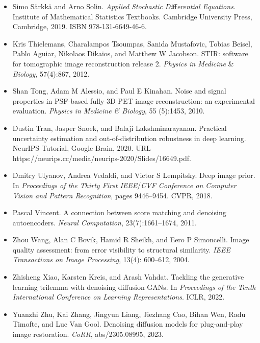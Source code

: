 \documentclass{article}
\begin{document}
\begin{itemize}
\item 
Simo Särkkä and Arno Solin. \textit{Applied Stochastic Di}ff\textit{erential Equations}. Institute of Mathematical Statistics Textbooks. Cambridge University Press, Cambridge, 2019. ISBN 978-131-6649-46-6.

\item 
Kris Thielemans, Charalampos Tsoumpas, Sanida Mustafovic, Tobias Beisel, Pablo Aguiar, Nikolaos Dikaios, and Matthew W Jacobson. STIR: software for tomographic image reconstruction release 2. \textit{Physics in Medicine} \& \textit{Biology}, 57(4):867, 2012.

\item 
Shan Tong, Adam M Alessio, and Paul E Kinahan. Noise and signal properties in PSF-based fully 3D PET image reconstruction: an experimental evaluation. \textit{Physics in Medicine \& Biology}, 55 (5):1453, 2010.

\item 
Dustin Tran, Jasper Snoek, and Balaji Lakshminarayanan. Practical uncertainty estimation and out-of-distribution robustness in deep learning. NeurIPS Tutorial, Google Brain, 2020. URL https://neurips.cc/media/neurips-2020/Slides/16649.pdf.

\item 
Dmitry Ulyanov, Andrea Vedaldi, and Victor S Lempitsky. Deep image prior. In \textit{Proceedings of the Thirty First IEEE}/\textit{CVF Conference on Computer Vision and Pattern Recognition}, pages 9446–9454. CVPR, 2018.

\item 
Pascal Vincent. A connection between score matching and denoising autoencoders. \textit{Neural Computation}, 23(7):1661–1674, 2011.

\item 
Zhou Wang, Alan C Bovik, Hamid R Sheikh, and Eero P Simoncelli. Image quality assessment: from error visibility to structural similarity. \textit{IEEE Transactions on Image Processing}, 13(4): 600–612, 2004.

\item 
Zhisheng Xiao, Karsten Kreis, and Arash Vahdat. Tackling the generative learning trilemma with denoising diffusion GANs. In \textit{Proceedings of the Tenth International Conference on Learning Representations}. ICLR, 2022.

\item 
Yuanzhi Zhu, Kai Zhang, Jingyun Liang, Jiezhang Cao, Bihan Wen, Radu Timofte, and Luc Van Gool. Denoising diffusion models for plug-and-play image restoration. \textit{CoRR}, abs/2305.08995, 2023.

\end{itemize}
\end{document}
